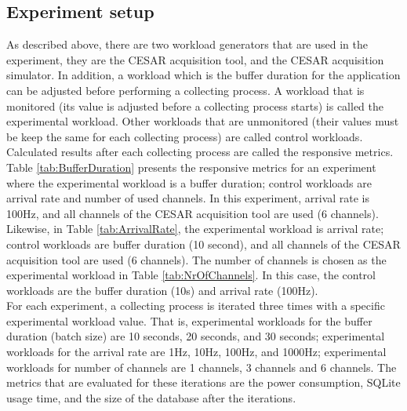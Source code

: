 \subsection{Experiment setup}
As described above, there are two workload generators that are used in the experiment, they are the CESAR acquisition tool, and the CESAR acquisition simulator. In addition, a workload which is the buffer duration for the application can be adjusted before performing a collecting process. A workload that is monitored (its value is adjusted before a collecting process starts) is called the experimental workload. Other workloads that are unmonitored (their values must be keep the same for each collecting process) are called control workloads. Calculated results after each collecting process are called the responsive metrics.\\
Table \ref{tab:BufferDuration} presents the responsive metrics for an experiment where the experimental workload is a buffer duration; control workloads are arrival rate and number of used channels. In this experiment, arrival rate is 100Hz, and all channels of the CESAR acquisition tool are used (6 channels). Likewise, in Table \ref{tab:ArrivalRate}, the experimental workload is arrival rate; control workloads are buffer duration (10 second), and all channels of the CESAR acquisition tool are used (6 channels). The number of channels is chosen as the experimental workload in Table \ref{tab:NrOfChannels}. In this case, the control workloads are the buffer duration (10s) and arrival rate (100Hz).\\
For each experiment, a collecting process is iterated three times with a specific experimental workload value. That is, experimental workloads for the buffer duration (batch size) are 10 seconds, 20 seconds, and 30 seconds; experimental workloads for the arrival rate are 1Hz, 10Hz, 100Hz, and 1000Hz; experimental workloads for number of channels are 1 channels, 3 channels and 6 channels. The metrics that are evaluated for these iterations are the power consumption, SQLite usage time, and the size of the database after the iterations.\\
